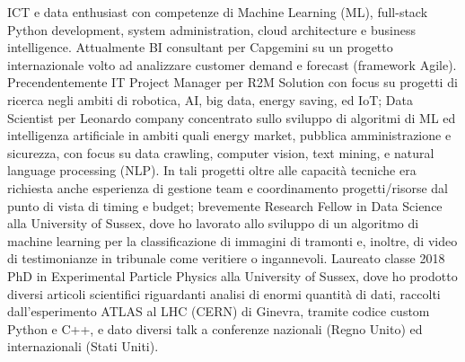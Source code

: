 
ICT e data enthusiast con competenze di Machine Learning (ML), full-stack Python development, system administration, cloud architecture e business intelligence. Attualmente BI consultant per Capgemini su un progetto internazionale volto ad analizzare customer demand e forecast (framework Agile). Precendentemente IT Project Manager per R2M Solution con focus su progetti di ricerca negli ambiti di robotica, AI, big data, energy saving, ed IoT; Data Scientist per Leonardo company concentrato sullo sviluppo di algoritmi di ML ed intelligenza artificiale in ambiti quali energy market, pubblica amministrazione e sicurezza, con focus su data crawling, computer vision, text mining, e natural language processing (NLP). In tali progetti oltre alle capacità tecniche era richiesta anche esperienza di gestione team e coordinamento progetti/risorse dal punto di vista di timing e budget; brevemente Research Fellow in Data Science alla University of Sussex, dove ho lavorato allo sviluppo di un algoritmo di machine learning per la classificazione di immagini di tramonti e, inoltre, di video di testimonianze in tribunale come veritiere o ingannevoli. Laureato classe 2018 PhD in Experimental Particle Physics alla University of Sussex, dove ho prodotto diversi articoli scientifici riguardanti analisi di enormi quantità di dati, raccolti dall'esperimento ATLAS al LHC (CERN) di Ginevra, tramite codice custom Python e C++, e dato diversi talk a conferenze nazionali (Regno Unito) ed internazionali (Stati Uniti).